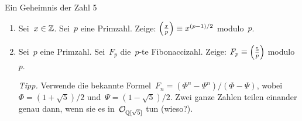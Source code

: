 \documentclass[entwurf]{uebblatt}
\begin{document}

\begin{aufgabe}{Ein Geheimnis der Zahl 5}
\begin{enumerate}
\item Sei~$x \in \mathbb{Z}$. Sei~$p$ eine Primzahl. Zeige: $\left(\frac{x}{p}\right) \equiv
x^{(p-1)/2}$ modulo~$p$.
\item Sei~$p$ eine Primzahl. Sei~$F_p$ die~$p$-te Fibonaccizahl. Zeige: $F_p
\equiv \left(\frac{5}{p}\right)$ modulo~$p$.

{\tiny\emph{Tipp.} Verwende die bekannte Formel~$F_n = (\Phi^n - \Psi^n) /
(\Phi - \Psi)$, wobei~$\Phi = (1 + \sqrt{5})/2$ und~$\Psi = (1 - \sqrt{5})/2$.
Zwei ganze Zahlen teilen einander genau dann, wenn sie es
in~$\mathcal{O}_{\mathbb{Q}[\sqrt{5}]}$ tun (wieso?).\par}
\end{enumerate}
\end{aufgabe}
\end{document}
